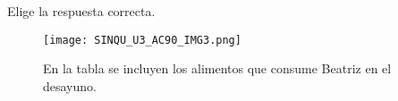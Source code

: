 Elige la respuesta correcta.
\begin{figure}[H]
    \centering
    \texttt{[image: SINQU\_U3\_AC90\_IMG3.png]}
    \caption{En la tabla se incluyen los alimentos que consume Beatriz en el desayuno.}
\end{figure}
\begin{parts}
    
    
    
    
    
\end{parts}
